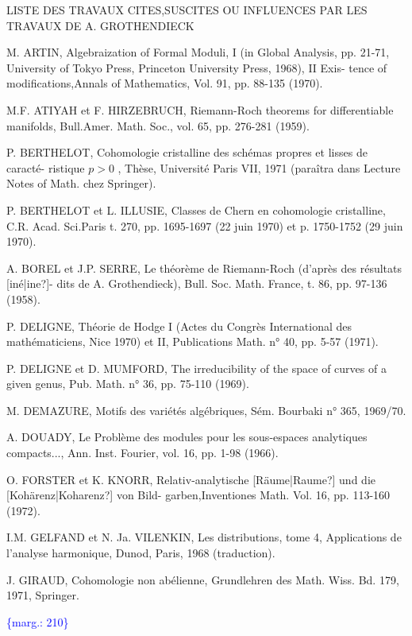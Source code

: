 \documentclass[11pt]{article}
\newcommand{\scanpage}[1]{\par\bigskip\noindent{\small\sffamily[scan #1]}\par}
\newcommand{\mspage}[1]{{\small\sffamily[p.\,#1]}}
\newcommand{\margin}[1]{\textcolor{blue}{\{\textsf{marg.:} #1\}}}
\newcommand{\unsure}[1]{[#1?]}
\begin{document}
LISTE DES TRAVAUX CITES,SUSCITES OU INFLUENCES PAR LES TRAVAUX DE A. GROTHENDIECK

M. ARTIN, Algebraization of Formal Moduli, I (in Global Analysis, pp. 21-71,
University of Tokyo Press, Princeton University Press, 1968), II Exis-%
tence of modifications,Annals of Mathematics, Vol. 91, pp. 88-135
(1970).

M.F. ATIYAH et F. HIRZEBRUCH, Riemann-Roch theorems for differentiable manifolds,
Bull.Amer. Math. Soc., vol. 65, pp. 276-281 (1959).

P. BERTHELOT, Cohomologie cristalline des schémas propres et lisses de caracté-%
ristique $p > 0$ , Thèse, Université Paris VII, 1971 (paraîtra dans
Lecture Notes of Math. chez Springer).

P. BERTHELOT et L. ILLUSIE, Classes de Chern en cohomologie cristalline, C.R. Acad.
Sci.Paris t. 270, pp. 1695-1697 (22 juin 1970) et p. 1750-1752
(29 juin 1970).

A. BOREL et J.P. SERRE, Le théorème de Riemann-Roch (d'après des résultats \unsure{iné|ine}-%
dits de A. Grothendieck), Bull. Soc. Math. France, t. 86,
pp. 97-136 (1958).

P. DELIGNE, Théorie de Hodge I (Actes du Congrès International des mathématiciens,
Nice 1970) et II, Publications Math. n° 40, pp. 5-57 (1971).

P. DELIGNE et D. MUMFORD, The irreducibility of the space of curves of a given
genus, Pub. Math. n° 36, pp. 75-110 (1969).

M. DEMAZURE, Motifs des variétés algébriques, Sém. Bourbaki n° 365, 1969/70.

A. DOUADY, Le Problème des modules pour les sous-espaces analytiques compacts...,
Ann. Inst. Fourier, vol. 16, pp. 1-98 (1966).

O. FORSTER et K. KNORR, Relativ-analytische \unsure{Räume|Raume} und die \unsure{Kohärenz|Koharenz} von Bild-%
garben,Inventiones Math. Vol. 16, pp. 113-160 (1972).

I.M. GELFAND et N. Ja. VILENKIN, Les distributions, tome 4, Applications de
l'analyse harmonique, Dunod, Paris, 1968 (traduction).

J. GIRAUD, Cohomologie non abélienne, Grundlehren des Math. Wiss. Bd. 179, 1971,
Springer.

\margin{210}

\clearpage
\scanpage{119/211}
\mspage{- 16 -}
\end{document}
